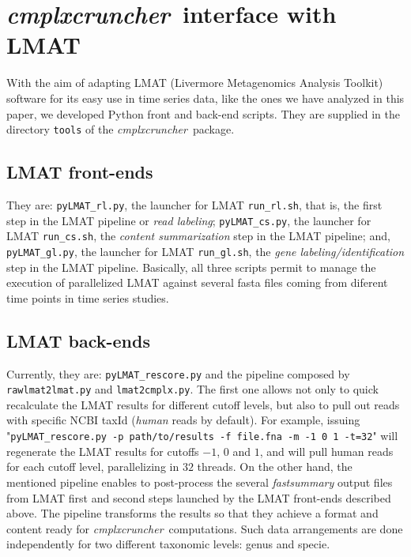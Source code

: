 \documentclass[12pt]{article}
\newcommand{\CC}[0]{\emph{cmplxcruncher}}
\begin{document}
\section{\CC\ interface with LMAT} \label{sec:lmat}
With the aim of adapting LMAT (Livermore Metagenomics Analysis Toolkit) software\cite{LMAT} for its easy use in time series data, like the ones we have analyzed in this paper\cite{kwashiorkor}, we developed Python front and back-end scripts. They are supplied in the directory \texttt{tools} of the \CC\ package.

\subsection{LMAT front-ends} They are: \texttt{pyLMAT\_rl.py}, the launcher for LMAT \texttt{run\_rl.sh}, that is, the first step in the LMAT pipeline or \emph{read labeling}; \texttt{pyLMAT\_cs.py}, the launcher for LMAT \texttt{run\_cs.sh}, the \emph{content summarization} step in the LMAT pipeline; and, \texttt{pyLMAT\_gl.py}, the launcher for LMAT \texttt{run\_gl.sh}, the \emph{gene labeling/identification} step in the LMAT pipeline. Basically, all three scripts permit to manage the execution of parallelized LMAT against several fasta files coming from diferent time points in time series studies.

\subsection{LMAT back-ends} Currently, they are: \texttt{pyLMAT\_rescore.py} and the pipeline composed by \texttt{rawlmat2lmat.py} and \texttt{lmat2cmplx.py}. The first one allows not only to quick recalculate the LMAT results for different cutoff levels, but also to pull out reads with specific NCBI taxId (\emph{human} reads by default). For example, issuing "\texttt{pyLMAT\_rescore.py -p path/to/results -f file.fna -m -1 0 1 -t=32}" will regenerate the LMAT results for cutoffs $-1$, $0$ and $1$, and will pull human reads for each cutoff level, parallelizing in $32$ threads. On the other hand, the mentioned pipeline enables to post-process the several \emph{fastsummary} output files from LMAT first and second steps launched by the LMAT front-ends described above. The pipeline transforms the results so that they achieve a format and content ready for \CC\ computations. Such data arrangements are done independently for two different taxonomic levels: genus and specie.
\end{document}
